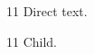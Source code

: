 \documentclass[paper=A4]{ropas-poster}
\begin{document}
\begin{postergrid}{1}{1}
Direct text.\begin{posterblock}{1}{1}
Child.
\end{posterblock}
\end{postergrid}
\end{document}
